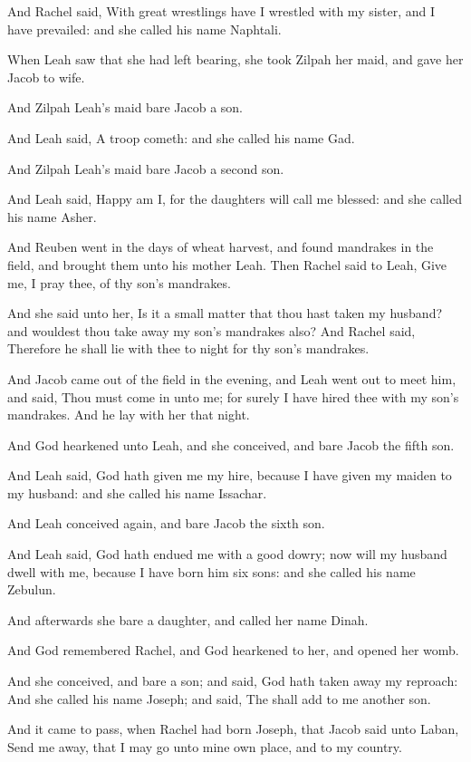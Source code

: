 \verse And Rachel said, With great wrestlings have I wrestled with my
sister, and I have prevailed: and she called his name Naphtali.

\verse When Leah saw that she had left bearing, she took Zilpah her
maid, and gave her Jacob to wife.

\verse And Zilpah Leah's maid bare Jacob a son.

\verse And Leah said, A troop cometh: and she called his name Gad.

\verse And Zilpah Leah's maid bare Jacob a second son.

\verse And Leah said, Happy am I, for the daughters will call me
blessed: and she called his name Asher.

\verse And Reuben went in the days of wheat harvest, and found
mandrakes in the field, and brought them unto his mother Leah. Then
Rachel said to Leah, Give me, I pray thee, of thy son's mandrakes.

\verse And she said unto her, Is it a small matter that thou hast taken
my husband? and wouldest thou take away my son's mandrakes also? And
Rachel said, Therefore he shall lie with thee to night for thy son's
mandrakes.

\verse And Jacob came out of the field in the evening, and Leah went
out to meet him, and said, Thou must come in unto me; for surely I
have hired thee with my son's mandrakes. And he lay with her that
night.

\verse And God hearkened unto Leah, and she conceived, and bare Jacob
the fifth son.

\verse And Leah said, God hath given me my hire, because I have given
my maiden to my husband: and she called his name Issachar.

\verse And Leah conceived again, and bare Jacob the sixth son.

\verse And Leah said, God hath endued me with a good dowry; now will my
husband dwell with me, because I have born him six sons: and she
called his name Zebulun.

\verse And afterwards she bare a daughter, and called her name Dinah.

\verse And God remembered Rachel, and God hearkened to her, and opened
her womb.

\verse And she conceived, and bare a son; and said, God hath taken away
my reproach: \verse And she called his name Joseph; and said, The \LORD
shall add to me another son.

\verse And it came to pass, when Rachel had born Joseph, that Jacob
said unto Laban, Send me away, that I may go unto mine own place, and
to my country.

